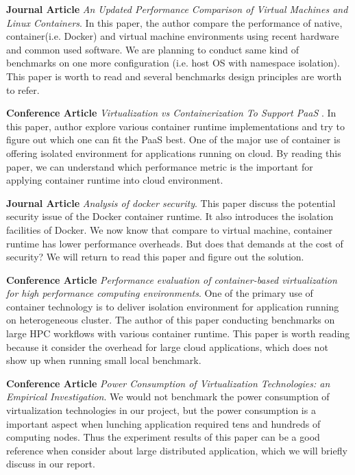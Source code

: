 \documentclass{article}
\begin{document}
\textbf{Journal Article} \emph{An Updated Performance Comparison of Virtual Machines and Linux 
Containers}\cite{felter2014updated}. In this paper, the author compare the performance of 
native, container(i.e. Docker) and virtual machine environments using recent hardware and common 
used software. We are planning to conduct same kind of benchmarks on one more configuration
(i.e. host OS with namespace isolation). This paper is worth to read and several benchmarks 
design principles are worth to refer.

\medskip

\textbf{Conference Article} \emph{Virtualization vs Containerization To Support PaaS}
\cite{dua2014virtualization}. In this paper, author explore various container runtime 
implementations and try to figure out which one can fit the PaaS best. One of the major use
of container is offering isolated environment for applications running on cloud. By reading 
this paper, we can understand which performance metric is the important for applying 
container runtime into cloud environment.

\medskip

\textbf{Journal Article} \emph{Analysis of docker security}\cite{bui2015analysis}. This paper 
discuss the potential security issue of the Docker container runtime. It also introduces the 
isolation facilities of Docker. We now know that compare to virtual machine, container runtime 
has lower performance overheads. But does that demands at the cost of security? We will return to
read this paper and figure out the solution. 

\medskip

\textbf{Conference Article} \emph{Performance evaluation of container-based virtualization for 
high performance computing environments}\cite{xavier2013performance}. One of the primary use of
container technology is to deliver isolation environment for application running on heterogeneous 
cluster. The author of this paper conducting benchmarks on large HPC workflows with various 
container runtime. This paper is worth reading because it consider the overhead for large 
cloud applications, which does not show up when running small local benchmark.

\medskip

\textbf{Conference Article} \emph{Power Consumption of Virtualization Technologies: an 
Empirical Investigation}\cite{morabito2015power}. We would not benchmark the power consumption 
of virtualization technologies in our project, but the power consumption is a important 
aspect when lunching application required tens and hundreds of computing nodes. Thus the 
experiment results of this paper can be a good reference when consider about large distributed
application, which we will briefly discuss in our report.
\end{document}
